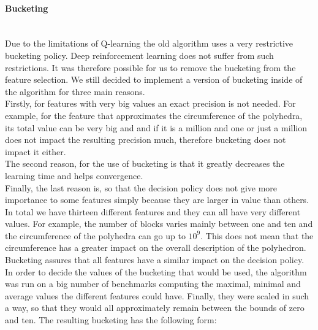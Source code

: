 \paragraph{Bucketing}\mbox{}\\
Due to the limitations of Q-learning the old algorithm uses a very restrictive bucketing policy. Deep reinforcement learning does not suffer from such restrictions. It was therefore possible for us to remove the bucketing from the feature selection. We still decided to implement a version of bucketing inside of the algorithm for three main reasons. \\
Firstly, for features with very big values an exact precision is not needed. For example, for the feature that approximates the circumference of the polyhedra, its total value can be very big and and if it is a million and one or just a million does not impact the resulting precision much, therefore bucketing does not impact it either. \\
The second reason, for the use of bucketing is that it greatly decreases the learning time and helps convergence. \\
Finally, the last reason is, so that the decision policy does not give more importance to some features simply because they are larger in value than others. In total we have thirteen different features and they can all have very different values. For example, the number of blocks varies mainly between one and ten and the circumference of the polyhedra can go up to $10^9$. This does not mean that the circumference has a greater impact on the overall description of the polyhedron. Bucketing assures that all features have a similar impact on the decision policy.\\
In order to decide the values of the bucketing that would be used,  the algorithm was run on a big number of benchmarks computing the maximal, minimal and average values the different features could have. Finally, they were scaled in such a way, so that they would all approximately remain between the bounds of zero and ten. The resulting bucketing has the following form:
